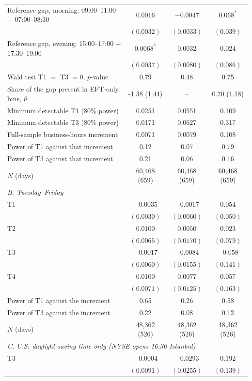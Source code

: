 \begin{tabular}{lccc}
Reference gap, morning: 09:00--11:00 $-$ 07:00--08:30 & $0.0016$ & $-0.0047$ & $0.068^{*}$ \\
 & $(0.0032)$ & $(0.0033)$ & $(0.039)$ \\
Reference gap, evening: 15:00--17:00 $-$ 17:30--19:00 & $0.0068^{*}$ & $0.0032$ & $0.024$ \\
 & $(0.0037)$ & $(0.0080)$ & $(0.086)$ \\
Wald test T1 $=$ T3 $=0$, $p$-value & 0.79 & 0.48 & 0.75 \\
Share of the gap present in EFT-only bins, $\vartheta$ & -1.38 (1.44) & -- & 0.70 (1.18) \\
Minimum detectable T1 (80\% power) & 0.0251 & 0.0551 & 0.109 \\
Minimum detectable T3 (80\% power) & 0.0171 & 0.0627 & 0.317 \\
Full-sample business-hours increment & 0.0071 & 0.0079 & 0.108 \\
Power of T1 against that increment & 0.12 & 0.07 & 0.79 \\
Power of T3 against that increment & 0.21 & 0.06 & 0.16 \\
$N$ (days) & 60,468 (659) & 60,468 (659) & 60,468 (659) \\
\midrule
\multicolumn{4}{l}{\emph{B. Tuesday--Friday}} \\
T1 & $-0.0035$ & $-0.0017$ & $0.054$ \\
 & $(0.0030)$ & $(0.0060)$ & $(0.050)$ \\
T2 & $0.0100$ & $0.0050$ & $0.023$ \\
 & $(0.0065)$ & $(0.0170)$ & $(0.079)$ \\
T3 & $-0.0017$ & $-0.0084$ & $-0.058$ \\
 & $(0.0060)$ & $(0.0155)$ & $(0.141)$ \\
T4 & $0.0100$ & $0.0077$ & $0.057$ \\
 & $(0.0071)$ & $(0.0125)$ & $(0.163)$ \\
Power of T1 against the increment & 0.65 & 0.26 & 0.58 \\
Power of T3 against the increment & 0.22 & 0.08 & 0.12 \\
$N$ (days) & 48,362 (526) & 48,362 (526) & 48,362 (526) \\
\midrule
\multicolumn{4}{l}{\emph{C. U.S. daylight-saving time only (NYSE opens 16:30 Istanbul)}} \\
T3 & $-0.0004$ & $-0.0293$ & $0.192$ \\
 & $(0.0091)$ & $(0.0255)$ & $(0.139)$ \\

\end{tabular}
